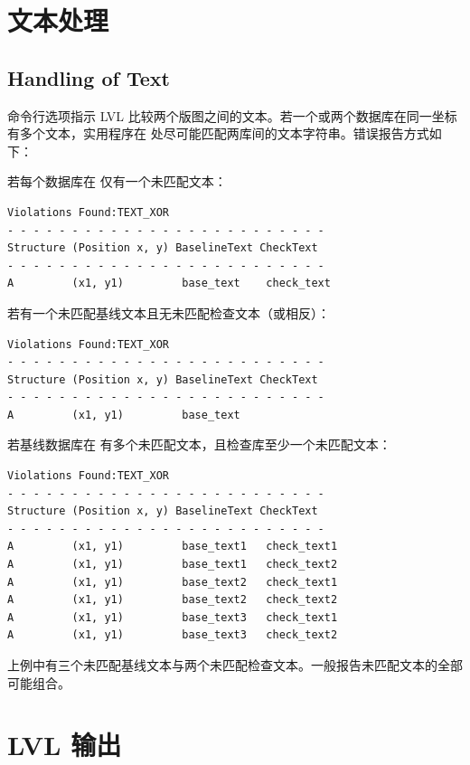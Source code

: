 \section{文本处理}
\subsection*{Handling of Text}

 命令行选项指示 LVL 比较两个版图之间的文本。若一个或两个数据库在同一坐标  有多个文本，实用程序在  处尽可能匹配两库间的文本字符串。错误报告方式如下：

若每个数据库在  仅有一个未匹配文本：
\begin{lstlisting}
Violations Found:TEXT_XOR
- - - - - - - - - - - - - - - - - - - - - - - - -
Structure (Position x, y) BaselineText CheckText
- - - - - - - - - - - - - - - - - - - - - - - - -
A         (x1, y1)         base_text    check_text
\end{lstlisting}

若有一个未匹配基线文本且无未匹配检查文本（或相反）：
\begin{lstlisting}
Violations Found:TEXT_XOR
- - - - - - - - - - - - - - - - - - - - - - - - -
Structure (Position x, y) BaselineText CheckText
- - - - - - - - - - - - - - - - - - - - - - - - -
A         (x1, y1)         base_text
\end{lstlisting}

若基线数据库在  有多个未匹配文本，且检查库至少一个未匹配文本：
\begin{lstlisting}
Violations Found:TEXT_XOR
- - - - - - - - - - - - - - - - - - - - - - - - -
Structure (Position x, y) BaselineText CheckText
- - - - - - - - - - - - - - - - - - - - - - - - -
A         (x1, y1)         base_text1   check_text1
A         (x1, y1)         base_text1   check_text2
A         (x1, y1)         base_text2   check_text1
A         (x1, y1)         base_text2   check_text2
A         (x1, y1)         base_text3   check_text1
A         (x1, y1)         base_text3   check_text2
\end{lstlisting}

上例中有三个未匹配基线文本与两个未匹配检查文本。一般报告未匹配文本的全部可能组合。

\section{LVL 输出}
